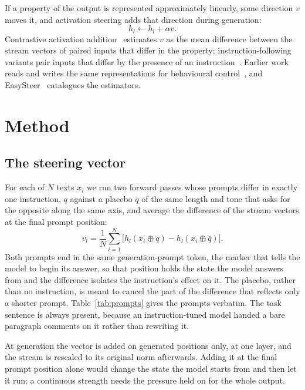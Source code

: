\documentclass[aps,prb,reprint,nofootinbib,a4paper]{revtex4-2}
\begin{document}
If a property of the output is represented approximately linearly, some
direction $v$ moves it, and activation steering adds that direction during
generation:
\begin{equation}
h_l \leftarrow h_l + \alpha v .
\label{eq:steer}
\end{equation}
Contrastive activation addition~\cite{caa} estimates $v$ as the mean difference
between the stream vectors of paired inputs that differ in the property;
instruction-following variants pair inputs that differ by the presence of an
instruction~\cite{stolfo2025}. Earlier work reads and writes the same
representations for behavioural control~\cite{repe,actadd,iti}, and
EasySteer~\cite{easysteer} catalogues the estimators.

\section{Method}

\subsection{The steering vector}
\label{sec:est}

For each of $N$ texts $x_i$ we run two forward passes whose prompts differ in
exactly one instruction, $q$ against a placebo $\bar q$ of the same length and
tone that asks for the opposite along the same axis, and average the difference
of the stream vectors at the final prompt position:
\begin{equation}
v_l = \frac{1}{N}\sum_{i=1}^{N}
      \bigl[h_l(x_i \oplus q) - h_l(x_i \oplus \bar q)\bigr].
\label{eq:idiff}
\end{equation}
Both prompts end in the same generation-prompt token, the marker that tells the
model to begin its answer, so that position holds the state the model answers
from and the difference isolates the instruction's effect on it. The placebo,
rather than no instruction, is meant to cancel the part of the difference that
reflects only a shorter prompt. Table~\ref{tab:prompts} gives the prompts
verbatim. The task sentence is always present, because an instruction-tuned
model handed a bare paragraph comments on it rather than rewriting it.

At generation the vector is added on generated positions only, at one layer,
and the stream is rescaled to its original norm afterwards. Adding it at the
final prompt position alone would change the state the model starts from and
then let it run; a continuous strength needs the pressure held on for the whole
output.
\end{document}
